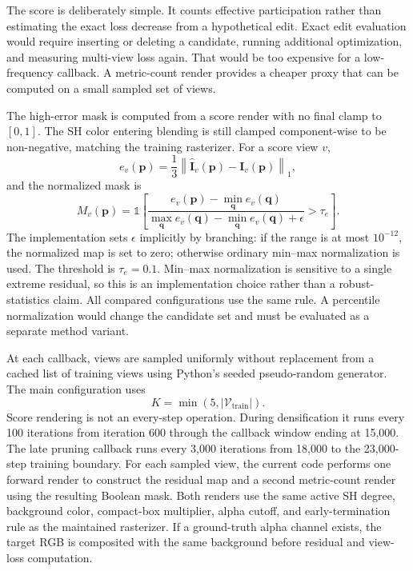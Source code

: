 The score is deliberately simple. It counts effective participation rather than estimating the exact loss decrease from a hypothetical edit. Exact edit evaluation would require inserting or deleting a candidate, running additional optimization, and measuring multi-view loss again. That would be too expensive for a low-frequency callback. A metric-count render provides a cheaper proxy that can be computed on a small sampled set of views.

The high-error mask is computed from a score render with no final clamp to $[0,1]$. The SH color entering blending is still clamped component-wise to be non-negative, matching the training rasterizer. For a score view $v$,
\begin{equation}
e_v(\mathbf{p})
=
\frac{1}{3}
\left\|
\hat{\mathbf{I}}_v(\mathbf{p})-\mathbf{I}_v(\mathbf{p})
\right\|_1,
\end{equation}
and the normalized mask is
\begin{equation}
M_v(\mathbf{p})
=
\mathbb{1}
\left[
\frac{e_v(\mathbf{p})-\min_{\mathbf{q}} e_v(\mathbf{q})}
{\max_{\mathbf{q}} e_v(\mathbf{q})-\min_{\mathbf{q}} e_v(\mathbf{q})+\epsilon}
>
\tau_e
\right].
\end{equation}
The implementation sets $\epsilon$ implicitly by branching: if the range is at most $10^{-12}$, the normalized map is set to zero; otherwise ordinary min--max normalization is used. The threshold is $\tau_e=0.1$. Min--max normalization is sensitive to a single extreme residual, so this is an implementation choice rather than a robust-statistics claim. All compared configurations use the same rule. A percentile normalization would change the candidate set and must be evaluated as a separate method variant.

At each callback, views are sampled uniformly without replacement from a cached list of training views using Python's seeded pseudo-random generator. The main configuration uses
\begin{equation}
K=\min(5,|\mathcal{V}_{\mathrm{train}}|).
\end{equation}
Score rendering is not an every-step operation. During densification it runs every 100 iterations from iteration 600 through the callback window ending at 15,000. The late pruning callback runs every 3,000 iterations from 18,000 to the 23,000-step training boundary. For each sampled view, the current code performs one forward render to construct the residual map and a second metric-count render using the resulting Boolean mask. Both renders use the same active SH degree, background color, compact-box multiplier, alpha cutoff, and early-termination rule as the maintained rasterizer. If a ground-truth alpha channel exists, the target RGB is composited with the same background before residual and view-loss computation.

